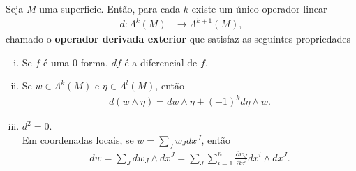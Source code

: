 \begin{proposition}
  Seja $M$ uma superficie. Então, para cada $k$ existe um único operador linear
  \begin{align*}
    d:\Lambda^{k}(M)&\to\Lambda^{k+1}(M),
  \end{align*}
  chamado o \textbf{operador derivada exterior} que satisfaz as seguintes propriedades
  \begin{enumerate}[i)]
    \item Se $f$ é uma $0$-forma, $df$ é a diferencial de $f$.
    \item Se $w\in\Lambda^{k}(M)$ e $\eta\in\Lambda^{l}(M)$, então
      \begin{align*}
        d(w\wedge\eta)=dw\wedge\eta + (-1)^{k}d\eta\wedge w.
      \end{align*}
    \item $d^{2}=0$.\\
      Em coordenadas locais, se $w=\sum_{J}w_Jdx^{J}$, então
      \begin{align*}
        dw=\sum_{J}dw_J\wedge dx^{J}=\sum_{J}\sum_{i=1}^{n}\frac{\partial w_J}{\partial x^{i}}dx^{i}\wedge dx^{J}.
      \end{align*}
  \end{enumerate}
\end{proposition}
